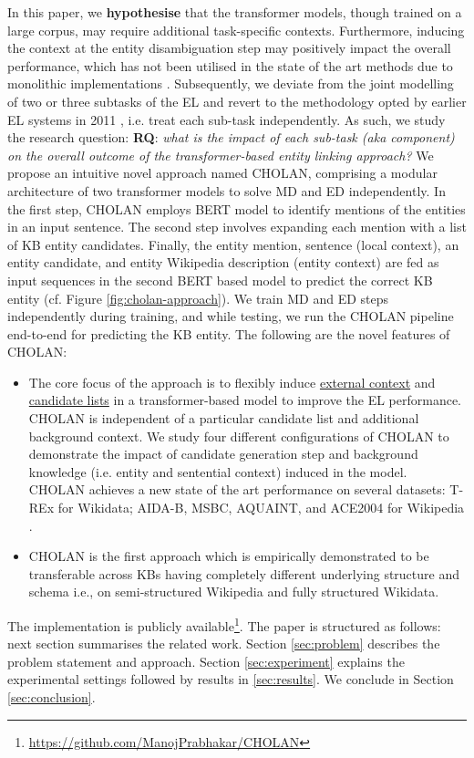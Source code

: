 \documentclass[11pt,a4paper]{article}
\begin{document}
In this paper, we \textbf{hypothesise} that the transformer models, though trained on a large corpus, may require additional task-specific contexts.
Furthermore, inducing the context at the entity disambiguation step may positively impact the overall performance, which has not been utilised in the state of the art methods due to monolithic implementations \cite{kolitsas2018end,peters2019knowledge,broscheit2019investigating,evry2020empirical}. Subsequently, we deviate from the joint modelling of two or three subtasks of the EL and revert to the methodology opted by earlier EL systems in 2011 \cite{DBLP:conf/emnlp/HoffartYBFPSTTW11}, i.e. treat each sub-task independently. As such, we study the research question: \textbf{RQ}: \textit{what is the impact of each sub-task (aka component) on the overall outcome of the transformer-based entity linking approach?} We propose an intuitive novel approach named CHOLAN, comprising a modular architecture of two transformer models to solve MD and ED independently. In the first step, CHOLAN employs BERT \cite{devlin2019bert} model to identify mentions of the entities in an input sentence. The second step involves expanding each mention with a list of KB entity candidates. Finally, the entity mention, sentence (local context), an entity candidate, and entity Wikipedia description (entity context) are fed as input sequences in the second BERT based model to predict the correct KB entity (cf. Figure \ref{fig:cholan-approach}). We train MD and ED steps independently during training, and while testing, we run the CHOLAN pipeline end-to-end for predicting the KB entity. The following are the novel features of CHOLAN:
\noindent\begin{itemize}
\itemsep-.4em 
\item The core focus of the approach is to flexibly induce \underline{external context} and \underline{candidate lists} in a transformer-based model to improve the EL performance.
CHOLAN is independent of a particular candidate list and additional background context. We study four different configurations of CHOLAN to demonstrate the impact of candidate generation step and background knowledge (i.e. entity and sentential context) induced in the model. CHOLAN achieves a new state of the art performance on several datasets: T-REx \cite{DBLP:conf/lrec/ElSaharVRGHLS18} for Wikidata; AIDA-B, MSBC, AQUAINT, and ACE2004 for Wikipedia \cite{DBLP:conf/emnlp/HoffartYBFPSTTW11,guo2018robust}. 
\item CHOLAN is the first approach which is empirically demonstrated to be transferable across KBs having completely different underlying structure and schema i.e., on semi-structured Wikipedia and fully structured Wikidata. 
\end{itemize} 
The implementation is publicly available\footnote{\url{https://github.com/ManojPrabhakar/CHOLAN}}. 
The paper is structured as follows: 
next section summarises the related work. Section \ref{sec:problem} describes the problem statement and approach. Section \ref{sec:experiment} explains the experimental settings followed by results in \ref{sec:results}. We conclude in Section \ref{sec:conclusion}.\\
\end{document}
